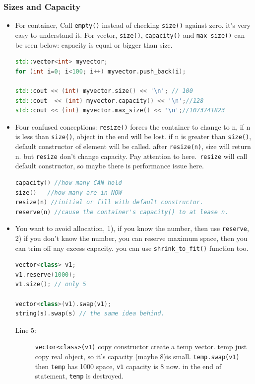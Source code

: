 \documentclass[a4paper,11pt,twoside]{book}
\begin{document}
\subsubsection{Sizes and Capacity}
\begin{itemize}
	\item For container, Call \texttt{empty()} instead of checking \texttt{size()} against zero. it's very easy to understand it. For vector, \texttt{size()}, \texttt{capacity()} and \texttt{max\_size()} can be seen below: capacity is equal or bigger than size. 
\begin{lstlisting}[frame=single, language=c++]
std::vector<int> myvector;
for (int i=0; i<100; i++) myvector.push_back(i);

std::cout << (int) myvector.size() << '\n'; // 100
std::cout  << (int) myvector.capacity() << '\n';//128
std::cout << (int) myvector.max_size() << '\n';//1073741823
\end{lstlisting}	
	
	
	\item Four confused conceptions: \texttt{resize()} forces the container to change to n, if n is less than \texttt{size()},  object in the end will be lost. if n is greater than \texttt{size()},  default constructor of element will be called. after \texttt{resize(n)}, size will return n. but \texttt{resize} don't change capacity. Pay attention to here.\texttt{ resize} will call default constructor, so maybe there is performance issue here.
\begin{lstlisting}[frame=single, language=c++]
capacity() //how many CAN hold
size()   //how many are in NOW
resize(n) //initial or fill with default constructor.
reserve(n) //cause the container's capacity() to at lease n.
\end{lstlisting}	
	
	\item You want to avoid allocation, 1), if you know the number, then use \texttt{reserve}, 2) if you don't know the number, you can reserve maximum space, then you can trim off any excess capacity.  you can use \texttt{shrink\_to\_fit()} function too. 
\begin{lstlisting}[frame=single, language=c++]
vector<class> v1;
v1.reserve(1000); 
v1.size(); // only 5

vector<class>(v1).swap(v1);
string(s).swap(s) // the same idea behind.
\end{lstlisting}
	\begin{description}
		\item[Line 5:] \texttt{vector<class>(v1)} copy constructor create a temp vector. temp just copy real object, so it's capacity (maybe 8)is small. \texttt{temp.swap(v1)} then \texttt{temp} has 1000 space,  \texttt{v1} capacity is 8 now. in the end of statement, \texttt{temp} is destroyed.
	\end{description}
	

\end{itemize}
\end{document}
